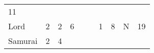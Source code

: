 \documentclass[12pt]{article}
\newcommand{\indexClass}[1]{\index{#1}}
\newcommand{\class}[1]{#1\indexClass{#1}}
\begin{document}
\begin{longtable}[]{@{}llllllllll@{}}
\begin{minipage}[t]{0.08\columnwidth}\raggedright\strut
11
\strut\end{minipage}\tabularnewline
\begin{minipage}[t]{0.13\columnwidth}\raggedright\strut
\class{Lord}
\strut\end{minipage} &
\begin{minipage}[t]{0.06\columnwidth}\raggedright\strut
2
\strut\end{minipage} &
\begin{minipage}[t]{0.06\columnwidth}\raggedright\strut
2
\strut\end{minipage} &
\begin{minipage}[t]{0.06\columnwidth}\raggedright\strut
6
\strut\end{minipage} &
\begin{minipage}[t]{0.06\columnwidth}\raggedright\strut
\strut\end{minipage} &
\begin{minipage}[t]{0.06\columnwidth}\raggedright\strut
\strut\end{minipage} &
\begin{minipage}[t]{0.06\columnwidth}\raggedright\strut
1
\strut\end{minipage} &
\begin{minipage}[t]{0.06\columnwidth}\raggedright\strut
8
\strut\end{minipage} &
\begin{minipage}[t]{0.07\columnwidth}\raggedright\strut
N
\strut\end{minipage} &
\begin{minipage}[t]{0.08\columnwidth}\raggedright\strut
19
\strut\end{minipage}\tabularnewline
\begin{minipage}[t]{0.13\columnwidth}\raggedright\strut
\class{Samurai}
\strut\end{minipage} &
\begin{minipage}[t]{0.06\columnwidth}\raggedright\strut
2
\strut\end{minipage} &
\begin{minipage}[t]{0.06\columnwidth}\raggedright\strut
4
\strut\end{minipage} &
\begin{minipage}[t]{0.06\columnwidth}\raggedright\strut
\strut\end{minipage} &
\begin{minipage}[t]{0.06\columnwidth}\raggedright\strut
\strut\end{minipage} &

\end{longtable}
\end{document}
